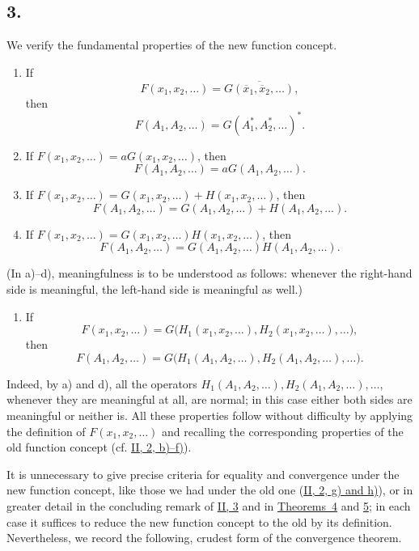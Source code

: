 \documentclass[12pt,b5paper,twoside]{article}
\begin{document}
\subsection*{3.}
\label{sec:IV.3}
We verify the fundamental properties of the new function concept.
\begin{enumerate}[label=\alph*)]
\item If
\[
 F(x_1,x_2,\ldots)=\overline{G(\overline{x}_1,\overline{x}_2,\ldots)},
\]
then
\[
 F(A_1,A_2,\ldots)=G(A_1^*,A_2^*,\ldots)^*.
\]

\item If $F(x_1,x_2,\ldots)=aG(x_1,x_2,\ldots)$, then
\[
 F(A_1,A_2,\ldots)=aG(A_1,A_2,\ldots).
\]

\item If
$F(x_1,x_2,\ldots)=G(x_1,x_2,\ldots)+H(x_1,x_2,\ldots)$, then
\[
 F(A_1,A_2,\ldots)=G(A_1,A_2,\ldots)+H(A_1,A_2,\ldots).
\]

\item If
$F(x_1,x_2,\ldots)=G(x_1,x_2,\ldots)H(x_1,x_2,\ldots)$, then
\[
 F(A_1,A_2,\ldots)=G(A_1,A_2,\ldots)H(A_1,A_2,\ldots).
\]
\end{enumerate}
(In a)--d), meaningfulness is to be understood as follows: whenever the right-hand
side is meaningful, the left-hand side is meaningful as well.)

\begin{enumerate}[label=\alph*),start=5]
\item If
\[
 F(x_1,x_2,\ldots)
 =G\bigl(H_1(x_1,x_2,\ldots),H_2(x_1,x_2,\ldots),\ldots\bigr),
\]
then
\[
 F(A_1,A_2,\ldots)
 =G\bigl(H_1(A_1,A_2,\ldots),H_2(A_1,A_2,\ldots),\ldots\bigr).
\]
\end{enumerate}
Indeed, by a) and d), all the operators
$H_1(A_1,A_2,\ldots),H_2(A_1,A_2,\ldots),\ldots$, whenever they are meaningful at
all, are normal; in this case either both sides are meaningful or neither is.  All
these properties follow without difficulty by applying the definition of
$F(x_1,x_2,\ldots)$ and recalling the corresponding properties of the old function
concept (cf. \hyperref[sec:II.2]{II, 2, b)--f)}).

It is unnecessary to give precise criteria for equality and convergence under the new
function concept, like those we had under the old one
(\hyperref[sec:II.2]{II, 2, g) and h)}), or in greater detail in the concluding remark
of \hyperref[sec:II.3]{II, 3} and in \hyperref[thm:4]{Theorems~4} and
\hyperref[thm:5]{5}; in each case it suffices to reduce the new function concept to
the old by its definition.  Nevertheless, we record the following, crudest form of
the convergence theorem.
\end{document}
